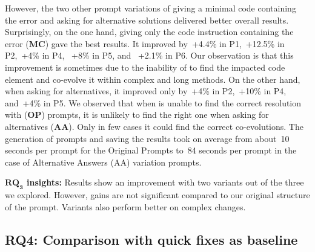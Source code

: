 However, the two other prompt variations of giving a minimal code containing the error and asking for alternative solutions delivered better overall results. 
Surprisingly, on the one hand, giving only the code instruction containing the error (\textbf{MC}) gave the best results. It improved by~+4.4\% in P1,~+12.5\% in P2,~+4\% in P4, ~+8\% in P5, and ~+2.1\% in P6. 
Our observation is that this improvement is sometimes due to the inability of \LLM to find the impacted code element and co-evolve it within complex and long methods. 
On the other hand, when asking for alternatives, it improved only by~+4\% in P2,~+10\% in P4, and~+4\% in P5. We observed that when \LLM is unable to find the correct resolution with (\textbf{OP}) prompts, it is unlikely to find the right one when asking for alternatives (\textbf{AA}). Only in few cases it could find the correct co-evolutions.  %
The generation of prompts and saving the results took on average from about~10 seconds per prompt for the Original Prompts to~84 seconds per prompt in the case of Alternative Answers (AA) variation prompts.



\begin{tcolorbox}[boxsep=-2pt]
\textbf{$\boldsymbol{RQ_3}$ insights:}
Results show an improvement with two variants out of the three we explored. However, gains are not significant compared to our original structure of the prompt. 
Variants also perform better on complex changes. 
\end{tcolorbox}

\subsection{RQ4: Comparison with quick fixes as baseline}



